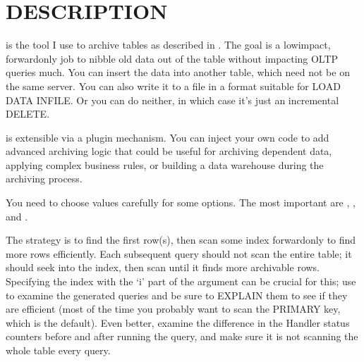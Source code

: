 \documentclass[letterpaper,10pt,english]{sphinxmanual}
\begin{document}
\section{DESCRIPTION}
\label{\detokenize{mariadb-archiver:description}}
 is the tool I use to archive tables as described in
.  The goal is a low\sphinxhyphen{}impact, forward\sphinxhyphen{}only
job to nibble old data out of the table without impacting OLTP queries much.
You can insert the data into another table, which need not be on the same
server.  You can also write it to a file in a format suitable for LOAD DATA
INFILE.  Or you can do neither, in which case it’s just an incremental DELETE.

 is extensible via a plugin mechanism.  You can inject your own
code to add advanced archiving logic that could be useful for archiving
dependent data, applying complex business rules, or building a data warehouse
during the archiving process.

You need to choose values carefully for some options.  The most important are
{\hyperref[\detokenize{mariadb-archiver:cmdoption-mariadb-archiver-limit}]{}}, {\hyperref[\detokenize{mariadb-archiver:cmdoption-mariadb-archiver-retries}]{}}, and {\hyperref[\detokenize{mariadb-archiver:cmdoption-mariadb-archiver-txn-size}]{}}.

The strategy is to find the first row(s), then scan some index forward\sphinxhyphen{}only to
find more rows efficiently.  Each subsequent query should not scan the entire
table; it should seek into the index, then scan until it finds more archivable
rows.  Specifying the index with the ‘i’ part of the {\hyperref[\detokenize{mariadb-archiver:cmdoption-mariadb-archiver-source}]{}} argument can
be crucial for this; use {\hyperref[\detokenize{mariadb-archiver:cmdoption-mariadb-archiver-dry-run}]{}} to examine the generated queries and be
sure to EXPLAIN them to see if they are efficient (most of the time you probably
want to scan the PRIMARY key, which is the default).  Even better, examine the
difference in the Handler status counters before and after running the query,
and make sure it is not scanning the whole table every query.
\end{document}
